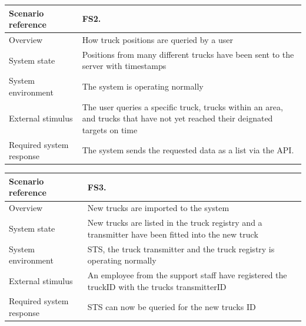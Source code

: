 \documentclass[a4paper,11pt]{report}
\begin{document}
\begin{center}
  \begin{tabular}[h!]{| >{\columncolor{gray}}p{} | p{} |}
    \hline
    Scenario reference & FS2. \\
    \hline
    Overview & How truck positions are queried by a user \\
    \hline
    System state & Positions from many different trucks have been sent to the server with timestamps\\
    \hline
    System environment & The system is operating normally\\
    \hline
    External stimulus & The user queries a specific truck, trucks within an area, and trucks that have not yet reached their deignated targets on time\\
    \hline
    Required system response & The system sends the requested data as a list via the API. \\
    \hline
  \end{tabular}
\end{center}

\begin{center}
  \begin{tabular}[h!]{| >{\columncolor{gray}}p{} | p{} |}
    \hline
    Scenario reference & FS3. \\
    \hline
    Overview & New trucks are imported to the system \\
    \hline
    System state & New trucks are listed in the truck registry and a transmitter have been fitted into the new truck\\
    \hline
    System environment & STS, the truck transmitter and the truck registry is operating normally\\
    \hline
    External stimulus & An employee from the support staff have registered the truckID with the trucks transmitterID \\
    \hline
    Required system response & STS can now be queried for the new trucks ID \\
    \hline
  \end{tabular}
\end{center}
\end{document}
